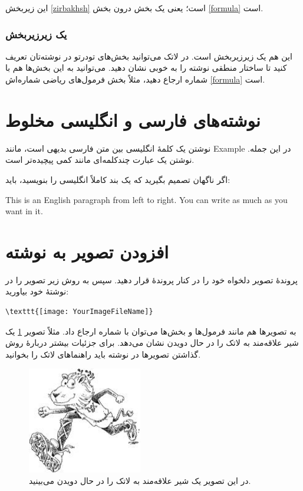 این زیربخش \ref{zirbakhsh} است؛ یعنی یک بخش درون بخش \ref{formula} است.
\subsubsection{یک زیرزیربخش}
این هم یک زیرزیربخش است. در لاتک می‌توانید بخش‌های تودرتو در نوشته‌تان تعریف کنید تا ساختار منطقی نوشته را به خوبی نشان دهید. می‌توانید به این بخش‌ها هم با شماره ارجاع دهید، مثلاً بخش فرمول‌های ریاضی شماره‌اش \ref{formula} است.
\section{نوشته‌های فارسی و انگلیسی مخلوط}
نوشتن یک کلمهٔ انگلیسی بین متن فارسی بدیهی است، مانند Example در این جمله.
نوشتن یک عبارت چندکلمه‌ای مانند
  کمی پیچیده‌تر است.

اگر ناگهان تصمیم بگیرید که یک بند کاملاً انگلیسی را بنویسید، باید:
\begin{latin}
This is an English paragraph from left to right. You can write as much as you want in it.
\end{latin}
\section{افزودن تصویر به نوشته}
پروندهٔ تصویر دلخواه خود را در کنار پروندهٔ  قرار دهید. سپس به روش زیر تصویر را در نوشتهٔ خود بیاورید:
\begin{latin}
\begin{verbatim}
\texttt{[image: YourImageFileName]}
\end{verbatim}
\end{latin}
به تصویرها هم مانند فرمول‌ها و بخش‌ها می‌توان با شماره ارجاع داد. مثلاً تصویر  \ref{fig:shir} یک شیر علاقه‌مند به لاتک را در حال دویدن نشان می‌دهد. برای جزئیات بیشتر دربارهٔ روش گذاشتن تصویرها در نوشته باید راهنماهای لاتک را بخوانید.
\begin{figure}%
\centerline{\includegraphics[width=5cm]{lion}}
\caption{در این تصویر یک شیر علاقه‌مند به لاتک را در حال دویدن می‌بینید.}
\label{fig:shir}
\end{figure}

